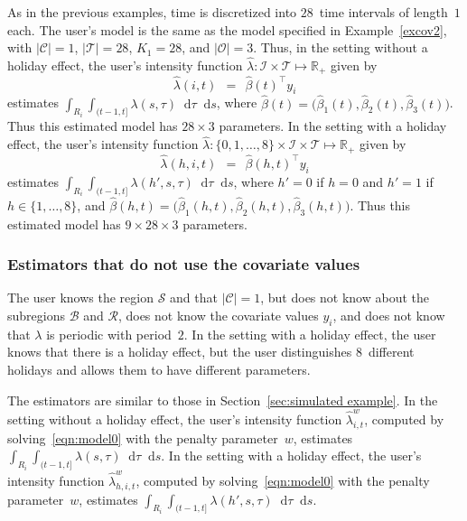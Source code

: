 \documentclass[article]{jss}
\newcommand{\RR}{\mathbb{R}}
\def\diff{\mathop{}\!\mathrm{d}}
\begin{document}
As in the previous examples, time is discretized into $28$~time intervals of length~$1$ each.
The user's model is the same as the model specified in Example~\ref{excov2}, with $|\mathcal{C}| = 1$, $|\mathcal{T}| = 28$, $K_{1} = 28$, and $|\mathcal{O}| = 3$.
Thus, in the setting without a holiday effect, the user's intensity function $\hat{\lambda} : \mathcal{I} \times \mathcal{T} \mapsto \RR_{+}$ given by
\[
\hat{\lambda}(i,t) \ \ = \ \ \hat{\beta}(t)^{\top} y_{i}
\]
estimates $\displaystyle \int_{R_{i}} \int_{(t-1,t]} \lambda(s,\tau) \diff \tau \diff s$, where $\hat{\beta}(t) = \big(\hat{\beta}_{1}(t),\hat{\beta}_{2}(t),\hat{\beta}_{3}(t)\big)$.
Thus this estimated model has $28 \times 3$ parameters.
In the setting with a holiday effect, the user's intensity function $\hat{\lambda} : \{0,1,\ldots,8\} \times \mathcal{I} \times \mathcal{T} \mapsto \RR_{+}$ given by
\[
\hat{\lambda}(h,i,t) \ \ = \ \ \hat{\beta}(h,t)^{\top} y_{i}
\]
estimates $\displaystyle \int_{R_{i}} \int_{(t-1,t]} \lambda(h',s,\tau) \diff \tau \diff s$, where $h' = 0$ if $h = 0$ and $h' = 1$ if $h \in \{1,\ldots,8\}$, and $\hat{\beta}(h,t) = \big(\hat{\beta}_{1}(h,t),\hat{\beta}_{2}(h,t),\hat{\beta}_{3}(h,t)\big)$.
Thus this estimated model has $9 \times 28 \times 3$ parameters.


\subsubsection{Estimators that do not use the covariate values}

The user knows the region $\mathcal{S}$ and that $|\mathcal{C}| = 1$, but does not know about the  subregions $\mathcal{B}$ and $\mathcal{R}$, does not know the covariate values $y_{i}$, and does not know that $\lambda$ is periodic with period~$2$.
In the setting with a holiday effect, the user knows that there is a holiday effect, but the user distinguishes $8$~different holidays and allows them to have different parameters.

The estimators are similar to those in Section~\ref{sec:simulated example}.
In the setting without a holiday effect, the user's intensity function $\hat{\lambda}^{w}_{i,t}$, computed by solving~\eqref{eqn:model0} with the penalty parameter~$w$, estimates $\displaystyle \int_{R_{i}} \int_{(t-1,t]} \lambda(s,\tau) \diff \tau \diff s$.
In the setting with a holiday effect, the user's intensity function $\hat{\lambda}^{w}_{h,i,t}$, computed by solving~\eqref{eqn:model0} with the penalty parameter~$w$, estimates $\displaystyle \int_{R_{i}} \int_{(t-1,t]} \lambda(h',s,\tau) \diff \tau \diff s$.
\end{document}
